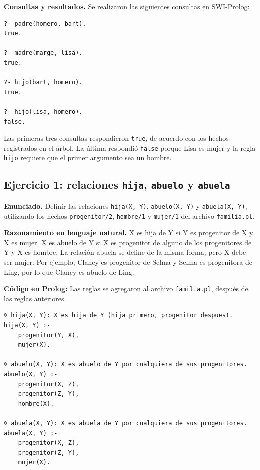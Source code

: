 \documentclass[12pt,letterpaper]{article}
\begin{document}
\noindent\textbf{Consultas y resultados.} Se realizaron las siguientes consultas en
SWI-Prolog:

\begin{lstlisting}
?- padre(homero, bart).
true.

?- madre(marge, lisa).
true.

?- hijo(bart, homero).
true.

?- hijo(lisa, homero).
false.
\end{lstlisting}

Las primeras tres consultas respondieron \texttt{true}, de acuerdo con los hechos
registrados en el árbol. La última respondió \texttt{false} porque Lisa es mujer y
la regla \texttt{hijo} requiere que el primer argumento sea un hombre.

\subsection{Ejercicio 1: relaciones \texttt{hija}, \texttt{abuelo} y \texttt{abuela}}

\noindent\textbf{Enunciado.} Definir las relaciones \texttt{hija(X, Y)},
\texttt{abuelo(X, Y)} y \texttt{abuela(X, Y)}, utilizando los hechos
\texttt{progenitor/2}, \texttt{hombre/1} y \texttt{mujer/1} del archivo
\texttt{familia.pl}.

\noindent\textbf{Razonamiento en lenguaje natural.} X es hija de Y si Y es progenitor de X
y X es mujer. X es abuelo de Y si X es progenitor de alguno de los progenitores de
Y y X es hombre. La relación abuela se define de la misma forma, pero X debe ser
mujer. Por ejemplo, Clancy es progenitor de Selma y Selma es progenitora de Ling,
por lo que Clancy es abuelo de Ling.

\noindent\textbf{Código en Prolog:} Las reglas se agregaron al archivo \texttt{familia.pl},
después de las reglas anteriores.

\begin{lstlisting}
% hija(X, Y): X es hija de Y (hija primero, progenitor despues).
hija(X, Y) :-
    progenitor(Y, X),
    mujer(X).

% abuelo(X, Y): X es abuelo de Y por cualquiera de sus progenitores.
abuelo(X, Y) :-
    progenitor(X, Z),
    progenitor(Z, Y),
    hombre(X).

% abuela(X, Y): X es abuela de Y por cualquiera de sus progenitores.
abuela(X, Y) :-
    progenitor(X, Z),
    progenitor(Z, Y),
    mujer(X).
\end{lstlisting}
\end{document}
